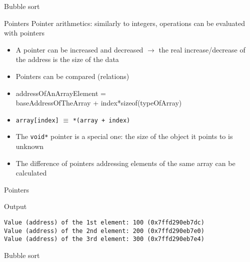 \documentclass[usenames,dvipsnames,aspectratio=169]{beamer}
\begin{document}
\begin{frame}{Bubble sort}
  \begin{exampleblock}{}
    \footnotesize
    
  \end{exampleblock}
\end{frame}

\begin{frame}{Pointers}
  Pointer arithmetics: similarly to integers, operations can be evaluated with pointers
  \begin{itemize}
    \item A pointer can be increased and decreased $\to$ the real increase/decrease of the address is the size of the data
    \item Pointers can be compared (relations)
    \item addressOfAnArrayElement = \\ \qquad baseAddressOfTheArray + index*sizeof(typeOfArray)
    \item \texttt{array[index]} $\equiv$ \texttt{*(array + index)}
    \item The \texttt{void*} pointer is a special one: the size of the object it points to is unknown
    \item The difference of pointers addressing elements of the same array can be calculated
  \end{itemize}
\end{frame}

\begin{frame}[fragile]{Pointers}
\begin{exampleblock}{}
    \footnotesize
    
  \end{exampleblock}
  \begin{block}{Output}
    \begin{verbatim}
Value (address) of the 1st element:	100 (0x7ffd290eb7dc)
Value (address) of the 2nd element:	200 (0x7ffd290eb7e0)
Value (address) of the 3rd element:	300 (0x7ffd290eb7e4)    
\end{verbatim}
  \end{block}
\end{frame}

\begin{frame}{Bubble sort}
  \begin{exampleblock}{}
    
  \end{exampleblock}
\end{frame}
\end{document}
